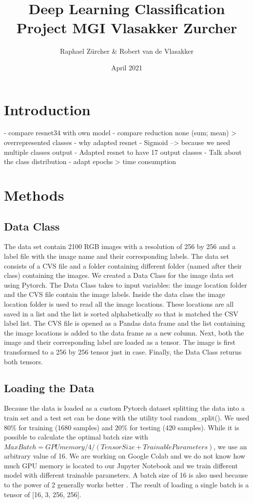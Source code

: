 \documentclass{article}
\title{Deep Learning Classification Project MGI Vlasakker Zurcher}
\author{Raphael Zürcher \& Robert van de Vlasakker}
\date{April 2021}
\begin{document}
\maketitle

\section{Introduction}
- compare resnet34 with own model
- compare reduction none (sum; mean) > overrepresented classes 
- why adapted resnet
- Sigmoid --> because we need multiple classes output
- Adapted resnet to have 17 output classes
- Talk about the class distribution
- adapt epochs > time consumption



\section{Methods}
\subsection{Data Class}
The data set contain 2100 RGB images with a resolution of 256 by 256 and a label file with the image name and their corresponding labels.
The data set consists of a CVS file and a folder containing different folder (named after their class) containing the images.
We created a Data Class for the image data set using Pytorch. 
The Data Class takes to input variables: the image location folder and the CVS file contain the image labels.
Inside the data class the image location folder is used to read all the image locations.
These locations are all saved in a list and the list is sorted alphabetically so that is matched the CSV label list.
The CVS file is opened as a Pandas data frame and the list containing the image locations is added to the data frame as a new column.
Next, both the image and their corresponding label are loaded as a tensor.
The image is first transformed to a 256 by 256 tensor just in case. 
Finally, the Data Class returns both tensors.

\subsection{Loading the Data}
Because the data is loaded as a custom Pytorch dataset splitting the data into a train set and a test set can be done with the utility tool random\_split().
We used 80\% for training (1680 samples) and 20\% for testing (420 samples).
While it is possible to calculate the optimal batch size with \(Max Batch = GPU memory  / 4 / (Tensor Size + Trainable Parameters)\), we use an arbitrary value of 16.
We are working on Google Colab and we do not know how much GPU memory is located to our Jupyter Notebook and we train different model with different trainable parameters.
A batch size of 16 is also used because to the power of 2 generally works better \citep{DBLP:journals/corr/KeskarMNST16}.
The result of loading a single batch is a tensor of [16, 3, 256, 256].
\end{document}
